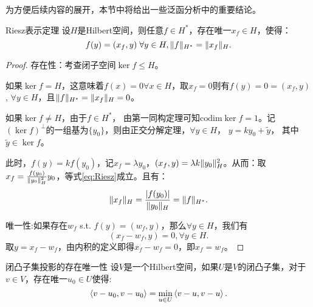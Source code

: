 为方便后续内容的展开，本节中将给出一些泛函分析中的重要结论。
\begin{proposition}{Riesz表示定理}
  \label{thm:Riesz}
  设$H$是Hilbert空间，则任意$f\in H^{*}$，存在唯一$x_{f}\in H$，使得：
  \begin{equation}
    \label{eq:Riesz}
    f(y)=(x_{f},y)\;\forall y\in H,\|f\|_{H^{*}}=\|x_{f}\|_{H}.
  \end{equation}
\end{proposition}
\begin{proof}
  存在性：考查闭子空间$\ker f\le H$。

  如果$\ker f=H$，这意味着$f(x)=0\forall x\in H$，取$x_{f}=0$则有$f(y)=0=(x_{f},y)$, $\forall y\in H$，且$\|f\|_{H^{*}}=\|x_{f}\|_{H}=0$。

  如果$\ker f\neq H$，由于$f\in H^{*}$， 由第一同构定理可知$\text{codim}\ker f=1$。记$(\ker f)^{\perp}$的一组基为$\{y_{0}\}$，则由正交分解定理，$\forall y\in H$， $y=ky_{0}+\tilde{y}$， 其中$\tilde{y}\in \ker f$。
  
  此时，$f(y)=kf(y_{0})$，记$x_{f}=\lambda y_{0}$，$(x_{f},y)=\lambda k\|y_{0}\|_{H}^{2}$。从而：取$x_{f}=\frac{f(y_{0})}{\|y_{0}\|_{H}^{2}}y_{0}$，等式\eqref{eq:Riesz}成立。且有：
  \begin{equation}
    \label{eq:normeq}
    \|x_{f}\|_{H}=\frac{|f(y_{0})|}{\|y_{0}\|_{H}}=\|f\|_{H^{*}}.
  \end{equation}

  唯一性:如果存在$w_{f}$ s.t. $f(y)=(w_{f},y)$，那么$\forall y\in H$，我们有
  \begin{equation}
    (x_{f}-w_{f},y)=0,\forall y\in H.
  \end{equation} 
  取$y=x_{f}-w_{f}$，由内积的定义即得$x_{f}-w_{f}=0$，即$x_{f}=w_{f}$。
\end{proof}
\begin{proposition}{闭凸子集投影的存在唯一性}
  \label{thm:projection}
  设$V$是一个Hilbert空间，如果$U$是$V$的闭凸子集，对于$v\in V$，存在唯一$u_{0}\in U$使得:
  \begin{equation}
    \label{eq:uniqueproj}
    \left<v-u_{0},v-u_{0}\right>=\min_{u\in U}\left<v-u,v-u\right>.
  \end{equation}
\end{proposition}
